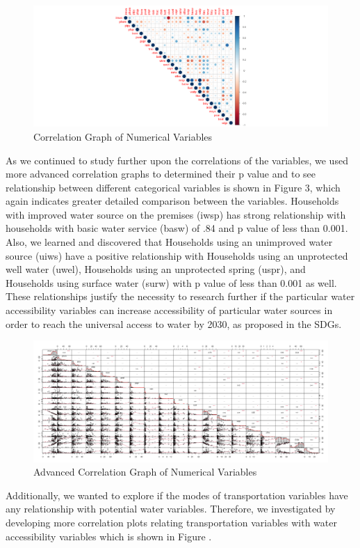 \documentclass[10pt,twoside]{article}
\numberwithin{equation}{section}
\newcommand{\?}{\stackrel{?}{=}}
\begin{document}
\begin{figure}[h!]
  \centering
  \includegraphics[width=.7\textwidth]{correlation-basic}
  \caption{Correlation Graph of Numerical Variables}
  \label{fig:year}
\end{figure}
As we continued to study further upon the correlations of the variables, we used more advanced correlation graphs to determined their p value and to see relationship between different categorical variables is shown in Figure 3, which again indicates greater detailed comparison between the variables. Households with improved water source on the premises (iwsp) has strong relationship with  households with basic water service (basw) of .84 and p value of less than 0.001. Also, we learned and discovered that Households using an unimproved water source (uiws) have a positive relationship with Households using an unprotected well water (uwel), Households using an unprotected spring (uspr), and Households using surface water (surw) with p value of less than 0.001 as well. These relationships justify the necessity to research further if the particular water accessibility variables can increase accessibility of particular water sources in order to reach the universal access to water by 2030, as proposed in the SDGs. 



\begin{figure}[h!]
  \centering
  \includegraphics[width=.7\textwidth]{adv-cor-plot}
  \caption{Advanced Correlation Graph of Numerical Variables}
  \label{fig:year}
\end{figure}
Additionally, we wanted to explore if the modes of transportation variables have any relationship with potential water variables. Therefore, we investigated by developing more correlation plots relating transportation variables with water accessibility variables which is shown in Figure . 
\end{document}

